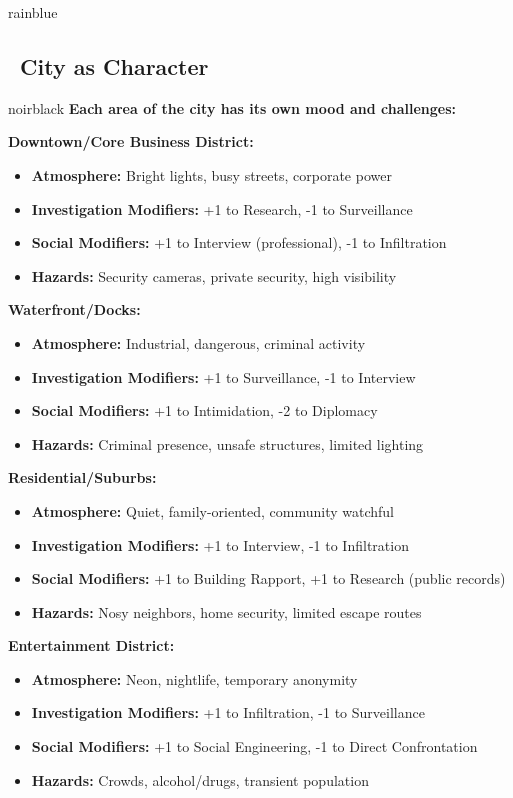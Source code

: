 \documentclass[11pt]{article}
\begin{document}
\begin{noirsection}{rainblue}
\subsection*{\faCity\ City as Character}

\begin{mechanicbox}{noirblack}
\textbf{Each area of the city has its own mood and challenges:}

\textbf{Downtown/Core Business District:}
\begin{itemize}
    \item \textbf{Atmosphere:} Bright lights, busy streets, corporate power
    \item \textbf{Investigation Modifiers:} +1 to Research, -1 to Surveillance
    \item \textbf{Social Modifiers:} +1 to Interview (professional), -1 to Infiltration
    \item \textbf{Hazards:} Security cameras, private security, high visibility
\end{itemize}

\textbf{Waterfront/Docks:}
\begin{itemize}
    \item \textbf{Atmosphere:} Industrial, dangerous, criminal activity
    \item \textbf{Investigation Modifiers:} +1 to Surveillance, -1 to Interview
    \item \textbf{Social Modifiers:} +1 to Intimidation, -2 to Diplomacy
    \item \textbf{Hazards:} Criminal presence, unsafe structures, limited lighting
\end{itemize}

\textbf{Residential/Suburbs:}
\begin{itemize}
    \item \textbf{Atmosphere:} Quiet, family-oriented, community watchful
    \item \textbf{Investigation Modifiers:} +1 to Interview, -1 to Infiltration
    \item \textbf{Social Modifiers:} +1 to Building Rapport, +1 to Research (public records)
    \item \textbf{Hazards:} Nosy neighbors, home security, limited escape routes
\end{itemize}

\textbf{Entertainment District:}
\begin{itemize}
    \item \textbf{Atmosphere:} Neon, nightlife, temporary anonymity
    \item \textbf{Investigation Modifiers:} +1 to Infiltration, -1 to Surveillance
    \item \textbf{Social Modifiers:} +1 to Social Engineering, -1 to Direct Confrontation
    \item \textbf{Hazards:} Crowds, alcohol/drugs, transient population
\end{itemize}


\end{mechanicbox}
\end{noirsection}
\end{document}
